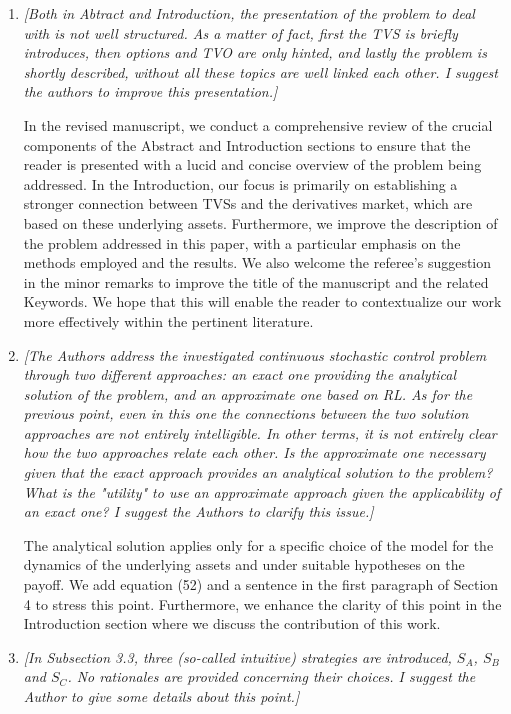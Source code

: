 \documentclass{article}
\begin{document}
\begin{enumerate}

 \item \textit{[Both in Abtract and Introduction, the presentation of the problem to deal with is not well structured. As a matter of fact, first the TVS is briefly introduces, then options and TVO are only hinted, and lastly the problem is shortly described, without all these topics are well linked each other. I suggest the authors to improve this presentation.]}

 In the revised manuscript, we conduct a comprehensive review of the crucial components of the Abstract and Introduction sections to ensure that the reader is presented with a lucid and concise overview of the problem being addressed. In the Introduction, our focus is primarily on establishing a stronger connection between TVSs and the derivatives market, which are based on these underlying assets. Furthermore, we improve the description of the problem addressed in this paper, with a particular emphasis on the methods employed and the results. We also welcome the referee's suggestion in the minor remarks to improve the title of the manuscript and the related Keywords. We hope that this will enable the reader to contextualize our work more effectively within the pertinent literature.

 \item \textit{[The Authors address the investigated continuous stochastic control problem through two different approaches: an exact one providing the analytical solution of the problem, and an approximate one based on RL. As for the previous point, even in this one the connections between the two solution approaches are not entirely intelligible. In other terms, it is not entirely clear how the two approaches relate each other. Is the approximate one necessary given that the exact approach provides an analytical solution to the problem? What is the "utility" to use an approximate approach given the applicability of an exact one? I suggest the Authors to clarify this issue.]} 
 
The analytical solution applies only for a specific choice of the model for the dynamics of the underlying  assets and under suitable hypotheses on the payoff. We add equation (52) and a sentence in the first paragraph of Section 4 to stress this point. Furthermore, we enhance the clarity of this point in the Introduction section where we discuss the contribution of this work.

 \item \textit{[In Subsection 3.3, three (so-called intuitive) strategies are introduced, $S_A$, $S_B$ and $S_C$. No rationales are provided concerning their choices. I suggest the Author to give some details about this point.]}


\end{enumerate}
\end{document}
